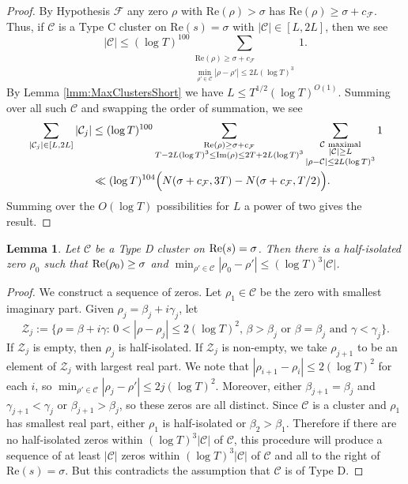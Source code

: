 \documentclass[12pt]{amsart}
\theoremstyle{plain}
\newtheorem{lemma}[theorem]{Lemma}
\theoremstyle{definition}
\theoremstyle{remark}
\begin{document}
%
%
%
%
\begin{proof}
By Hypothesis $\mathcal{F}$ any zero $\rho$ with $\text{Re}(\rho)>\sigma$ has $\text{Re}(\rho)\ge \sigma+c_\mathcal{F}$. Thus, if $\mathcal{C}$ is a Type C cluster on $\text{Re}(s)=\sigma$ with $|\mathcal{C}|\in[L,2L]$, then we see 
\[
|\mathcal{C}|\le (\log{T})^{100}\sum_{\substack{\text{Re}(\rho)\ge \sigma+c_{\mathcal{F}}\\ \min_{\rho'\in\mathcal{C}}|\rho-\rho'|\le 2L(\log{T})^3}}1.
\]
By Lemma \ref{lmm:MaxClustersShort} we have $L\leq T^{1/2}(\log T)^{O(1)}$. Summing over all such $\mathcal{C}$ and swapping the order of summation, we see 
\begin{align*}
\sum_{\substack{ |\mathcal{C}_j|\in[L,2L]}}|\mathcal{C}_j|&\le (\log{T})^{100}\sum_{\substack{\text{Re}(\rho)\ge \sigma+c_\mathcal{F} \\ T-2L(\log T)^3 \leq \text{Im}(\rho)\leq 2T + 2L(\log T)^3}}\sum_{\substack{\mathcal{C}\text{ maximal}\\ |\mathcal{C}|\ge L\\ |\rho-\mathcal{C}|\le 2L(\log{T})^3}}1\\
&\ll (\log{T})^{104}\Bigl(N(\sigma+c_\mathcal{F},3T)-N(\sigma+c_\mathcal{F},T/2)\Bigr).
\end{align*}
Summing over the $O(\log{T})$ possibilities for $L$ a power of two gives the result.
\end{proof}
%
%
%
%
\begin{lemma}\label{lmm:NearbyHalfIsolated}
Let $\mathcal{C}$ be a Type D cluster on $\textup{Re}(s)=\sigma$. Then there is a half-isolated zero $\rho_0$ such that $\textup{Re}(\rho_0)\ge \sigma$ and $\min_{\rho'\in\mathcal{C}}|\rho_0-\rho'|\le (\log{T})^3|\mathcal{C}|$.
\end{lemma}
%
%
%
%
\begin{proof}
We construct a sequence of zeros. Let $\rho_1\in\mathcal{C}$ be the zero with smallest imaginary part. Given $\rho_j=\beta_j+i\gamma_j$, let
\[
\mathcal{Z}_j:=\{\rho=\beta+i\gamma:\,0<|\rho-\rho_j|\le 2(\log{T})^2,\,\beta>\beta_j\text{ or }\beta=\beta_j\text{ and }\gamma< \gamma_j\}. 
\]
If $\mathcal{Z}_j$ is empty, then $\rho_j$ is half-isolated. If $\mathcal{Z}_j$ is non-empty, we take $\rho_{j+1}$ to be an element of $\mathcal{Z}_j$ with largest real part. We note that $|\rho_{i+1}-\rho_i|\le 2(\log{T})^2$ for each $i$, so $\min_{\rho'\in\mathcal{C}}|\rho_j-\rho'|\le 2j(\log{T})^2$. Moreover, either $\beta_{j+1}=\beta_j$ and $\gamma_{j+1}<\gamma_j$ or $\beta_{j+1}>\beta_j$, so these zeros are all distinct. Since $\mathcal{C}$ is a cluster and $\rho_1$ has smallest real part, either $\rho_1$ is half-isolated or $\beta_2>\beta_1$. Therefore if there are no half-isolated zeros within $(\log{T})^3|\mathcal{C}|$ of $\mathcal{C}$, this procedure will produce a sequence of at least $|\mathcal{C}|$ zeros within $(\log{T})^3|\mathcal{C}|$ of $\mathcal{C}$ and all to the right of $\text{Re}(s)=\sigma$. But this contradicts the assumption that $\mathcal{C}$ is of Type D.
\end{proof}
\end{document}
